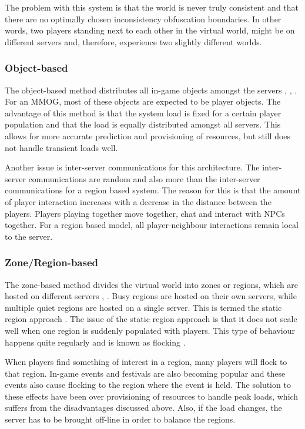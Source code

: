 \documentclass[10pt,a4paper,journal,cspaper,compsoc]{IEEEtran}
\begin{document}
The problem with this system is that the world is never truly consistent and that there are no optimally chosen inconsistency obfuscation boundaries.
In other words, two players standing next to each other in the virtual world, might be on different servers and, therefore, experience two slightly
different worlds.

\subsubsection{Object-based}
The object-based method distributes all in-game objects amongst the servers \cite{object_based_consistency1}, \cite{object_based_consistency2},
\cite{object_based_consistency3}. For an MMOG, most of these objects are expected to be player objects. The advantage of this method is that the
system load is fixed for a certain player population and that the load is equally distributed amongst all servers. This allows for more accurate
prediction and provisioning of resources, but still does not handle transient loads well.

Another issue is inter-server communications for this architecture. The inter-server communications are random and also more than the inter-server
communications for a region based system. The reason for this is that the amount of player interaction increases with a decrease in the distance
between the players. Players playing together move together, chat and interact with \acp{NPC} together. For a region based model, all
player-neighbour interactions remain local to the server.

\subsubsection{Zone/Region-based}
The zone-based method divides the virtual world into zones or regions, which are hosted on different servers \cite{zone_based_stat},
\cite{zone_based_dyn}. Busy regions are hosted on their own servers, while multiple quiet regions are hosted on a single server. This is termed the
static region approach \cite{zone_based_stat}. The issue of the static region approach is that it does not scale well when one region is suddenly
populated with players. This type of behaviour happens quite regularly and is known as flocking \cite{flocking}.

When players find something of interest in a region, many players will flock to that region. In-game events and festivals are also becoming popular
and these events also cause flocking to the region where the event is held. The solution to these effects have been over provisioning of resources to
handle peak loads, which suffers from the disadvantages discussed above. Also, if the load changes, the server has to be brought off-line in order to
balance the regions.
\end{document}

